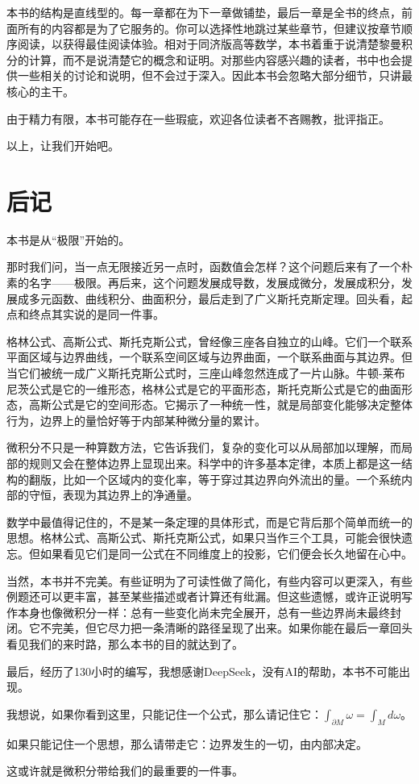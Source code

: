 本书的结构是直线型的。每一章都在为下一章做铺垫，最后一章是全书的终点，前面所有的内容都是为了它服务的。你可以选择性地跳过某些章节，但建议按章节顺序阅读，以获得最佳阅读体验。相对于同济版高等数学，本书着重于说清楚黎曼积分的计算，而不是说清楚它的概念和证明。对那些内容感兴趣的读者，书中也会提供一些相关的讨论和说明，但不会过于深入。因此本书会忽略大部分细节，只讲最核心的主干。

由于精力有限，本书可能存在一些瑕疵，欢迎各位读者不吝赐教，批评指正。

以上，让我们开始吧。


\tableofcontents
\hypertarget{toc}{}


\mainmatter











\backmatter
\chapter{后记}

本书是从“极限”开始的。

那时我们问，当一点无限接近另一点时，函数值会怎样？这个问题后来有了一个朴素的名字——极限。再后来，这个问题发展成导数，发展成微分，发展成积分，发展成多元函数、曲线积分、曲面积分，最后走到了广义斯托克斯定理。回头看，起点和终点其实说的是同一件事。

格林公式、高斯公式、斯托克斯公式，曾经像三座各自独立的山峰。它们一个联系平面区域与边界曲线，一个联系空间区域与边界曲面，一个联系曲面与其边界。但当它们被统一成广义斯托克斯公式时，三座山峰忽然连成了一片山脉。牛顿-莱布尼茨公式是它的一维形态，格林公式是它的平面形态，斯托克斯公式是它的曲面形态，高斯公式是它的空间形态。它揭示了一种统一性，就是局部变化能够决定整体行为，边界上的量恰好等于内部某种微分量的累计。

微积分不只是一种算数方法，它告诉我们，复杂的变化可以从局部加以理解，而局部的规则又会在整体边界上显现出来。科学中的许多基本定律，本质上都是这一结构的翻版，比如一个区域内的变化率，等于穿过其边界向外流出的量。一个系统内部的守恒，表现为其边界上的净通量。

数学中最值得记住的，不是某一条定理的具体形式，而是它背后那个简单而统一的思想。格林公式、高斯公式、斯托克斯公式，如果只当作三个工具，可能会很快遗忘。但如果看见它们是同一公式在不同维度上的投影，它们便会长久地留在心中。

当然，本书并不完美。有些证明为了可读性做了简化，有些内容可以更深入，有些例题还可以更丰富，甚至某些描述或者计算还有纰漏。但这些遗憾，或许正说明写作本身也像微积分一样：总有一些变化尚未完全展开，总有一些边界尚未最终封闭。它不完美，但它尽力把一条清晰的路径呈现了出来。如果你能在最后一章回头看见我们的来时路，那么本书的目的就达到了。

最后，经历了130小时的编写，我想感谢DeepSeek，没有AI的帮助，本书不可能出现。

我想说，如果你看到这里，只能记住一个公式，那么请记住它：\(\int_{\partial M}\omega=\int_M d\omega\)。

如果只能记住一个思想，那么请带走它：边界发生的一切，由内部决定。

这或许就是微积分带给我们的最重要的一件事。


